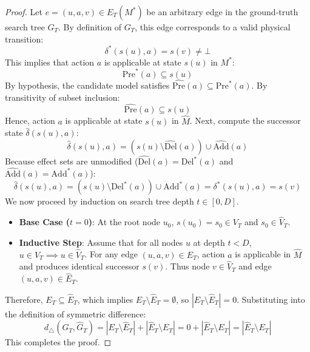 \documentclass[11pt,a4paper]{article}
\theoremstyle{definition}
\theoremstyle{remark}
\begin{document}
\begin{proof}
Let $e = (u, a, v) \in E_T(M^*)$ be an arbitrary edge in the ground-truth search tree $G_T$.
By definition of $G_T$, this edge corresponds to a valid physical transition:
\begin{equation}
    \delta^*(s(u), a) = s(v) \ne \bot
\end{equation}
This implies that action $a$ is applicable at state $s(u)$ in $M^*$:
\begin{equation}
    \text{Pre}^*(a) \subseteq s(u)
\end{equation}
By hypothesis, the candidate model satisfies $\widehat{\text{Pre}}(a) \subseteq \text{Pre}^*(a)$. By transitivity of subset inclusion:
\begin{equation}
    \widehat{\text{Pre}}(a) \subseteq s(u)
\end{equation}
Hence, action $a$ is applicable at state $s(u)$ in $\widehat{M}$.
Next, compute the successor state $\widehat{\delta}(s(u), a)$:
\begin{equation}
    \widehat{\delta}(s(u), a) = (s(u) \setminus \widehat{\text{Del}}(a)) \cup \widehat{\text{Add}}(a)
\end{equation}
Because effect sets are unmodified ($\widehat{\text{Del}}(a) = \text{Del}^*(a)$ and $\widehat{\text{Add}}(a) = \text{Add}^*(a)$):
\begin{equation}
    \widehat{\delta}(s(u), a) = (s(u) \setminus \text{Del}^*(a)) \cup \text{Add}^*(a) = \delta^*(s(u), a) = s(v)
\end{equation}
We now proceed by induction on search tree depth $t \in [0, D]$.
\begin{itemize}
    \item \textbf{Base Case ($t=0$)}: At the root node $u_0$, $s(u_0) = s_0 \in V_T$ and $s_0 \in \widehat{V}_T$.
    \item \textbf{Inductive Step}: Assume that for all nodes $u$ at depth $t < D$, $u \in V_T \implies u \in \widehat{V}_T$. For any edge $(u, a, v) \in E_T$, action $a$ is applicable in $\widehat{M}$ and produces identical successor $s(v)$. Thus node $v \in \widehat{V}_T$ and edge $(u, a, v) \in \widehat{E}_T$.
\end{itemize}
Therefore, $E_T \subseteq \widehat{E}_T$, which implies $E_T \setminus \widehat{E}_T = \emptyset$, so $|E_T \setminus \widehat{E}_T| = 0$.
Substituting into the definition of symmetric difference:
\begin{equation}
    d_\triangle(G_T, \widehat{G}_T) = |E_T \setminus \widehat{E}_T| + |\widehat{E}_T \setminus E_T| = 0 + |\widehat{E}_T \setminus E_T| = |\widehat{E}_T \setminus E_T|
\end{equation}
This completes the proof.
\end{proof}
\end{document}

